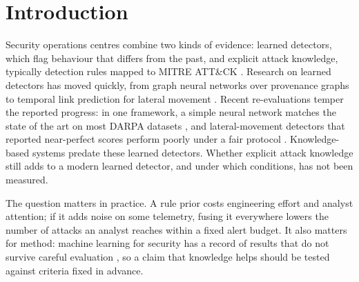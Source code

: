 \documentclass[acmlarge,screen,review]{acmart}
\begin{document}

\maketitle



\section{Introduction}\label{sec:intro}
Security operations centres combine two kinds of evidence: learned detectors, which flag behaviour that differs from
the past, and explicit attack knowledge, typically detection rules mapped to MITRE ATT\&CK
\cite{mitre2019ttphunting,mitre2026cti}. Research on learned detectors has moved quickly, from graph neural networks
over provenance graphs \cite{cheng2024kairos,jia2024magic,jiang2025orthrus,ren2025aptmgl} to temporal link prediction
for lateral movement \cite{king2022euler,xu2024argus,khoury2024jbeil}. Recent re-evaluations temper the reported
progress: in one framework, a simple neural network matches the state of the art on most DARPA datasets
\cite{bilot2025simpler,pidsmaker2026}, and lateral-movement detectors that reported near-perfect scores perform poorly
under a fair protocol \cite{larroche2026fair}. Knowledge-based systems
\cite{milajerdi2019holmes,hassan2019nodoze,hassan2020rapsheet,milajerdi2019poirot} predate these learned detectors.
Whether explicit attack knowledge still adds to a modern learned detector, and under which conditions, has not been
measured.

The question matters in practice. A rule prior costs engineering effort and analyst attention; if it adds noise on
some telemetry, fusing it everywhere lowers the number of attacks an analyst reaches within a fixed alert budget. It
also matters for method: machine learning for security has a record of results that do not survive careful
evaluation \cite{sommer2010outside,arp2022dos,pendlebury2019tesseract}, so a claim that knowledge helps should be
tested against criteria fixed in advance.
\end{document}
